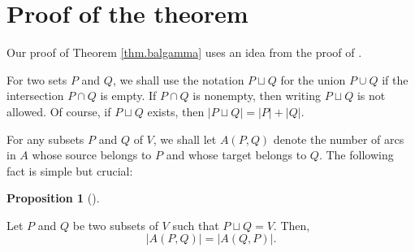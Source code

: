 \documentclass[numbers=enddot,12pt,final,onecolumn,notitlepage]{scrartcl}%
\theoremstyle{definition}
\newtheorem{prop}[theo]{Proposition}
\newenvironment{proposition}[1][]
{\begin{prop}[#1]\begin{leftbar}}
{\end{leftbar}\end{prop}}
\theoremstyle{plainsl}
\begin{document}
\section{Proof of the theorem}

Our proof of Theorem \ref{thm.balgamma} uses an idea from the proof of
\cite[Proposition 3.7]{PerPha15}.

For two sets $P$ and $Q$, we shall use the notation $P\sqcup Q$ for the union
$P\cup Q$ if the intersection $P\cap Q$ is empty. If $P\cap Q$ is nonempty,
then writing $P\sqcup Q$ is not allowed. Of course, if $P\sqcup Q$ exists,
then $\left\vert P\sqcup Q\right\vert =\left\vert P\right\vert +\left\vert
Q\right\vert $.

For any subsets $P$ and $Q$ of $V$, we shall let $A\left(  P,Q\right)  $
denote the number of arcs in $A$ whose source belongs to $P$ and whose target
belongs to $Q$. The following fact is simple but crucial:

\begin{proposition}
\label{prop.A-symmetry}Let $P$ and $Q$ be two subsets of $V$ such that
$P\sqcup Q=V$. Then,
\[
\left\vert A\left(  P,Q\right)  \right\vert =\left\vert A\left(  Q,P\right)
\right\vert .
\]

\end{proposition}
\end{document}
